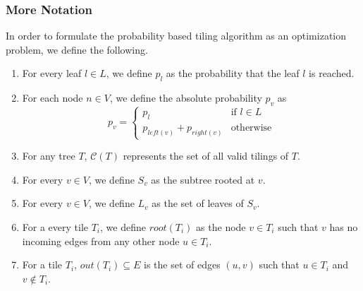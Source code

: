\subsubsection{More Notation}
In order to formulate the probability based tiling algorithm as an optimization problem, we define the following.
\begin{enumerate}
    \item For every leaf $l \in L$, we define $p_l$ as the probability that the leaf $l$ is reached.
    \item For each node $n \in V$, we define the absolute probability $p_v$ as
    \begin{equation}
        p_v = \begin{cases}
        p_l &\text{if $l \in L$}\\
        p_{left(v)} + p_{right(v)} &\text{otherwise}
        \end{cases}
    \end{equation}
    \item For any tree $T$, $\mathcal{C}(T)$ represents the set of all valid tilings of $T$.
    \item For every $v \in V$, we define $S_v$ as the subtree rooted at $v$.
    \item For every $v \in V$, we define $L_v$ as the set of leaves of $S_v$.
    \item For a every tile $T_i$, we define $root(T_i)$ as the node $v \in T_i$ such that $v$ has no incoming edges from any other node $u \in T_i$.
    \item For a tile $T_i$, $out(T_i) \subseteq E$ is the set of edges $(u, v)$ such that $u \in T_i$ and $v \notin T_i$.
\end{enumerate}

